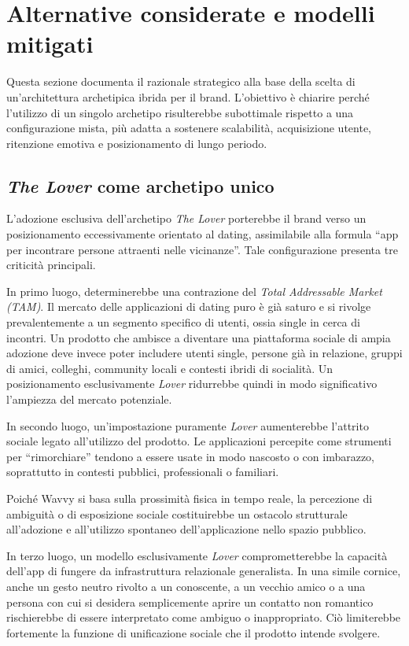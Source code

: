 \documentclass[a4paper, 11pt, table, dvipsnames]{article}
\begin{document}
\section{Alternative considerate e modelli mitigati}

Questa sezione documenta il razionale strategico alla base
della scelta di un'architettura archetipica ibrida per il brand.
L'obiettivo è chiarire perché l'utilizzo di un singolo
archetipo risulterebbe subottimale rispetto a una
configurazione mista, più adatta a sostenere scalabilità,
acquisizione utente, ritenzione emotiva e posizionamento di
lungo periodo.

\subsection{\textit{The Lover} come archetipo unico}

L'adozione esclusiva dell'archetipo \textit{The Lover} porterebbe
il brand verso un posizionamento eccessivamente orientato al
dating, assimilabile alla formula \enquote{app per incontrare persone attraenti nelle vicinanze}.
Tale configurazione presenta tre criticità principali.

In primo luogo, determinerebbe una contrazione del \textit{Total
      Addressable Market (TAM)}. Il mercato delle applicazioni di
dating puro è già saturo e si rivolge prevalentemente a un
segmento specifico di utenti, ossia single in cerca di
incontri. Un prodotto che ambisce a diventare una piattaforma
sociale di ampia adozione deve invece poter includere utenti
single, persone già in relazione, gruppi di amici,
colleghi, community locali e contesti ibridi di socialità.
Un posizionamento esclusivamente \textit{Lover} ridurrebbe
quindi in modo significativo l'ampiezza del mercato potenziale.

In secondo luogo, un'impostazione puramente \textit{Lover}
aumenterebbe l'attrito sociale legato all'utilizzo del prodotto.
Le applicazioni percepite come strumenti per \enquote{rimorchiare}
tendono a essere usate in modo nascosto o con imbarazzo,
soprattutto in contesti pubblici, professionali o familiari.

Poiché Wavvy si basa sulla prossimità fisica in tempo reale,
la percezione di ambiguità o di esposizione sociale
costituirebbe un ostacolo strutturale all'adozione e all'utilizzo
spontaneo dell'applicazione nello spazio pubblico.

In terzo luogo, un modello esclusivamente \textit{Lover}
comprometterebbe la capacità dell'app di fungere da
infrastruttura relazionale generalista. In una simile cornice,
anche un gesto neutro rivolto a un conoscente, a un vecchio amico o
a una persona con cui si desidera semplicemente aprire un contatto
non romantico rischierebbe di essere interpretato come ambiguo
o inappropriato. Ciò limiterebbe fortemente la funzione di
unificazione sociale che il prodotto intende svolgere.
\end{document}
